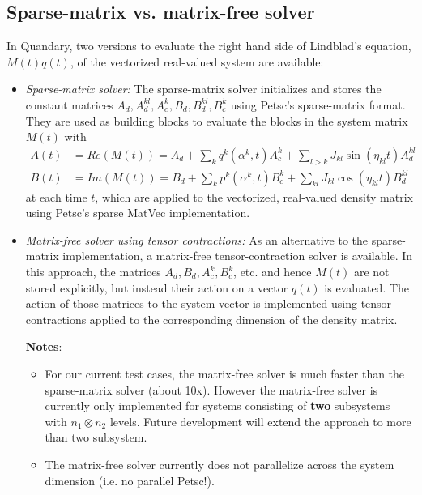\documentclass[11pt]{article}
\begin{document}
 \subsection{Sparse-matrix vs. matrix-free solver}

   In Quandary, two versions to evaluate the right hand side of Lindblad's
   equation, $M(t)q(t)$, of the vectorized real-valued system are available:
   \begin{itemize}
     \item \textit{Sparse-matrix solver:}
      The sparse-matrix solver initializes and stores the constant matrices
       $A_d, A_d^{kl}, A_c^k, B_d, B_d^{kl}, B_c^k$ using Petsc's sparse-matrix format. They are used
       as building blocks to evaluate the blocks in the system matrix $M(t)$ with 
     \begin{align}
       A(t) &= Re(M(t)) = A_d + \sum_k q^k(\alpha^k, t)A_c^k + \sum_{l>k} J_{kl} \sin(\eta_{kl}t) A_d^{kl}\\
       B(t) &= Im(M(t)) = B_d + \sum_k p^k(\alpha^k, t)B_c^k + \sum_{kl} J_{kl} \cos(\eta_{kl}t) B_d^{kl}
     \end{align}
   at each time $t$, which are applied to the vectorized, real-valued density matrix using Petsc's sparse MatVec implementation. 

   \item \textit{Matrix-free solver using tensor contractions:}
     As an alternative to the sparse-matrix implementation, a matrix-free tensor-contraction solver is available. In this approach, the matrices $A_d,B_d,
       A_c^k, B_c^k$, etc. and hence $M(t)$ are not stored explicitly, but instead
       their action on a vector $q(t)$ is evaluated. The
       action of those matrices to the system vector is implemented using
       tensor-contractions applied to the corresponding dimension of the density
       matrix. 

     \textbf{Notes}:
     \begin{itemize}
       \item For our current test cases, the matrix-free solver is much faster
         than the sparse-matrix solver (about 10x). However the matrix-free solver
         is currently only implemented for systems consisting of \textbf{two}
         subsystems with $n_1 \otimes n_2$ levels. Future development will
         extend the approach to more than two subsystem. 
       \item The matrix-free solver currently does not parallelize across the
         system dimension (i.e. no parallel Petsc!).
     \end{itemize}


   \end{itemize}
\end{document}
